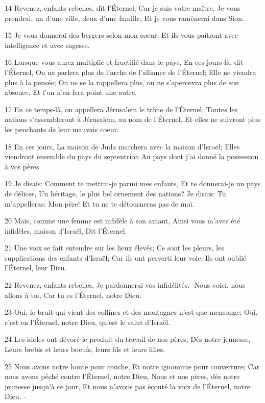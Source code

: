\par 14 Revenez, enfants rebelles, dit l'Éternel; Car je suis votre maître. Je vous prendrai, un d'une ville, deux d'une famille, Et je vous ramènerai dans Sion.
\par 15 Je vous donnerai des bergers selon mon coeur, Et ils vous paîtront avec intelligence et avec sagesse.
\par 16 Lorsque vous aurez multiplié et fructifié dans le pays, En ces jours-là, dit l'Éternel, On ne parlera plus de l'arche de l'alliance de l'Éternel; Elle ne viendra plus à la pensée; On ne se la rappellera plus, on ne s'apercevra plus de son absence, Et l'on n'en fera point une autre.
\par 17 En ce temps-là, on appellera Jérusalem le trône de l'Éternel; Toutes les nations s'assembleront à Jérusalem, au nom de l'Éternel, Et elles ne suivront plus les penchants de leur mauvais coeur.
\par 18 En ces jours, La maison de Juda marchera avec la maison d'Israël; Elles viendront ensemble du pays du septentrion Au pays dont j'ai donné la possession à vos pères.
\par 19 Je disais: Comment te mettrai-je parmi mes enfants, Et te donnerai-je un pays de délices, Un héritage, le plus bel ornement des nations? Je disais: Tu m'appelleras: Mon père! Et tu ne te détourneras pas de moi.
\par 20 Mais, comme une femme est infidèle à son amant, Ainsi vous m'avez été infidèles, maison d'Israël, Dit l'Éternel.
\par 21 Une voix se fait entendre sur les lieux élevés; Ce sont les pleurs, les supplications des enfants d'Israël; Car ils ont perverti leur voie, Ils ont oublié l'Éternel, leur Dieu.
\par 22 Revenez, enfants rebelles, Je pardonnerai vos infidélités. -Nous voici, nous allons à toi, Car tu es l'Éternel, notre Dieu.
\par 23 Oui, le bruit qui vient des collines et des montagnes n'est que mensonge; Oui, c'est en l'Éternel, notre Dieu, qu'est le salut d'Israël.
\par 24 Les idoles ont dévoré le produit du travail de nos pères, Dès notre jeunesse, Leurs brebis et leurs boeufs, leurs fils et leurs filles.
\par 25 Nous avons notre honte pour couche, Et notre ignominie pour couverture; Car nous avons péché contre l'Éternel, notre Dieu, Nous et nos pères, dès notre jeunesse jusqu'à ce jour, Et nous n'avons pas écouté la voix de l'Éternel, notre Dieu. -

